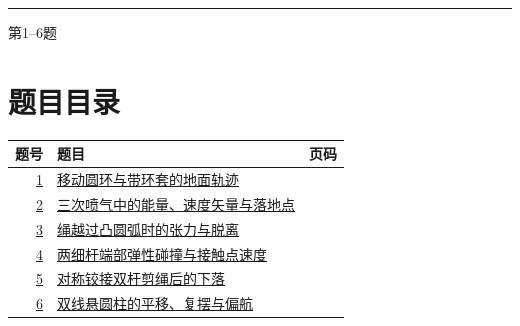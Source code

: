 \documentclass[UTF8,fontset=fandol,a4paper,11pt]{ctexart}
\begin{document}

\thispagestyle{empty}\vspace*{22mm}

\par\vspace{10mm}

\par\vspace{6mm}

\par\vspace{12mm}

\par\vspace{9mm}

\noindent\textcolor{accent}{\rule{\linewidth}{1pt}}\par\vspace{9mm}

\noindent 第1--6题\par\vfill\clearpage

\section*{题目目录}

\begin{longtable}{@{}r p{113mm} r@{}}\toprule 题号 & 题目 & 页码\\\midrule

\hyperref[q:1]{1} & \hyperref[q:1]{移动圆环与带环套的地面轨迹} & \pageref{q:1} \\

\hyperref[q:2]{2} & \hyperref[q:2]{三次喷气中的能量、速度矢量与落地点} & \pageref{q:2} \\

\hyperref[q:3]{3} & \hyperref[q:3]{绳越过凸圆弧时的张力与脱离} & \pageref{q:3} \\

\hyperref[q:4]{4} & \hyperref[q:4]{两细杆端部弹性碰撞与接触点速度} & \pageref{q:4} \\

\hyperref[q:5]{5} & \hyperref[q:5]{对称铰接双杆剪绳后的下落} & \pageref{q:5} \\

\hyperref[q:6]{6} & \hyperref[q:6]{双线悬圆柱的平移、复摆与偏航} & \pageref{q:6} \\

\bottomrule\end{longtable}
\end{document}
